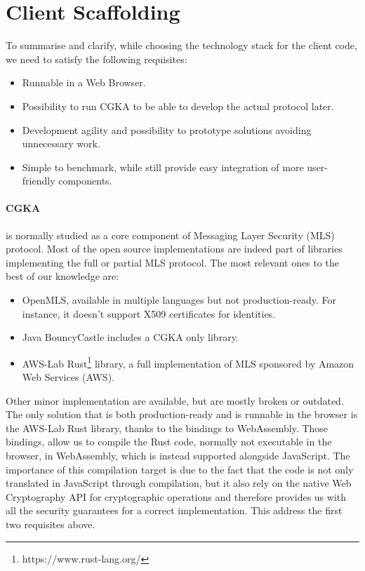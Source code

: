 \section{Client Scaffolding}
To summarise and clarify, while choosing the technology stack for the client code, we need to satisfy the following requisites:
\begin{itemize}
    \item Runnable in a Web Browser.
    \item Possibility to run CGKA to be able to develop the actual protocol later.
    \item Development agility and possibility to prototype solutions avoiding unnecessary work.
    \item Simple to benchmark, while still provide easy integration of more user-friendly components.
\end{itemize}

\paragraph{CGKA} is normally studied as a core component of Messaging Layer Security (MLS) protocol.
Most of the open source implementations are indeed part of libraries implementing the full or partial MLS protocol.
The most relevant ones to the best of our knowledge are:
\begin{itemize}
    \item OpenMLS, available in multiple languages but not production-ready. For instance, it doesn't support X509 certificates for identities.
    \item Java BouncyCastle includes a CGKA only library.
    \item AWS-Lab Rust\footnote{https://www.rust-lang.org/} library, a full implementation of MLS sponsored by Amazon Web Services (AWS). 
\end{itemize}

Other minor implementation are available, but are mostly broken or outdated.
The only solution that is both production-ready and is runnable in the browser is the AWS-Lab Rust library, thanks to the bindings to WebAssembly.
Those bindings, allow us to compile the Rust code, normally not executable in the browser, in WebAssembly, which is instead supported alongside JavaScript.
The importance of this compilation target is due to the fact that the code is not only translated in JavaScript through compilation, but it also rely on the native Web Cryptography API for cryptographic operations and therefore provides us with all the security guarantees for a correct implementation.
This address the first two requisites above.

